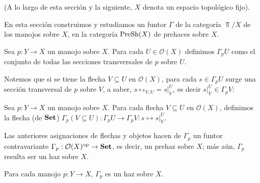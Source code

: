 (A lo largo de esta sección y la siguiente, $X$ denota un espacio topológico fijo).

En esta sección construimos y estudiamos un funtor $\Gamma$ de la categoría $\Top /X$ de los manojos sobre $X$, en la categoría $\normalfont{\text{PreSh}} (X)$ de prehaces sobre $X$.

\begin{Def}
   Sea $p:Y\to X$ un manojo sobre $X$. Para cada $U\in\mathcal{O}(X)$ definimos $\Gamma_p U$ como el conjunto de todas las secciones transversales de $p$ sobre $U$.
   
\end{Def}
Notemos que si se tiene la flecha $V\subseteq U$ en $\mathcal{O}(X)$, para cada $s\in\Gamma_p U$ surge una sección transversal de $p$ sobre $V$, a saber, $s\circ \iota_{V,U}=s|^{U}_{V}$, es decir $s|^{U}_{V}\in\Gamma_p V$:

\begin{Def}
   Sea $p:Y\to X$ un manojo sobre $X$. Para cada flecha $V\subseteq U$ en $\mathcal{O}(X)$, definimos la flecha (de $\normalfont{\textbf{Set}}$) $\Gamma_p(V\subseteq U):\Gamma_p U\to \Gamma_p V:s\mapsto s|^{U}_{V}$. 
\end{Def}
Las anteriores asignaciones de flechas y objetos hacen de $\Gamma_p$ un funtor contravariante $\Gamma_p:\mathcal{O}(X)^{\text{op}}\to \normalfont{\textbf{Set}}$, es decir, un prehaz sobre $X$; más aún, $\Gamma_p$ resulta ser un haz sobre $X$.
\begin{Prop}
   Para cada manojo $p:Y\to X$, $\Gamma_p$ es un haz sobre $X$.
\end{Prop}
